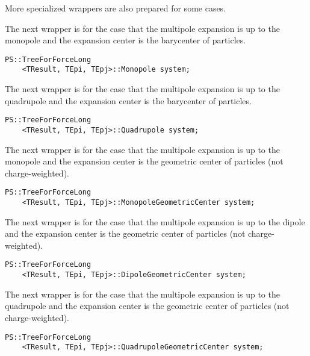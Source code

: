 More specialized wrappers are also prepared for some cases.

The next wrapper is for the case that the multipole expansion is up to the monopole and the expansion center is the barycenter of particles.

\begin{screen}
\begin{verbatim}
PS::TreeForForceLong
    <TResult, TEpi, TEpj>::Monopole system;
\end{verbatim}
\end{screen}

The next wrapper is for the case that the multipole expansion is up to the quadrupole and the expansion center is the barycenter of particles.

\begin{screen}
\begin{verbatim}
PS::TreeForForceLong
    <TResult, TEpi, TEpj>::Quadrupole system;
\end{verbatim}
\end{screen}

The next wrapper is for the case that the multipole expansion is up to the monopole and the expansion center is the geometric center of particles (not charge-weighted).

\begin{screen}
\begin{verbatim}
PS::TreeForForceLong
    <TResult, TEpi, TEpj>::MonopoleGeometricCenter system;
\end{verbatim}
\end{screen}

The next wrapper is for the case that the multipole expansion is up to the dipole and the expansion center is the geometric center of particles (not charge-weighted).

\begin{screen}
\begin{verbatim}
PS::TreeForForceLong
    <TResult, TEpi, TEpj>::DipoleGeometricCenter system;
\end{verbatim}
\end{screen}

The next wrapper is for the case that the multipole expansion is up to the quadrupole and the expansion center is the geometric center of particles (not charge-weighted).

\begin{screen}
\begin{verbatim}
PS::TreeForForceLong
    <TResult, TEpi, TEpj>::QuadrupoleGeometricCenter system;
\end{verbatim}
\end{screen}

